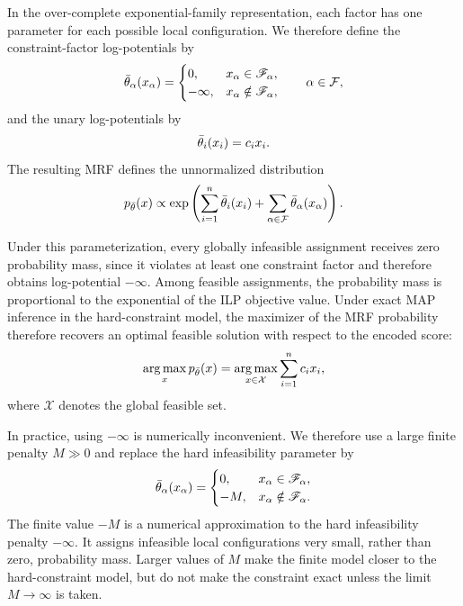 In the over-complete exponential-family representation, each factor has one parameter for each possible local configuration. We therefore define the
constraint-factor log-potentials by 
\begin{equation}
    \bar{\theta}_{\alpha}(x_{\alpha})
    =
    \begin{cases}
        0, & x_{\alpha} \in \mathscr{F}_{\alpha},\\
        -\infty, & x_{\alpha} \notin \mathscr{F}_{\alpha},
    \end{cases}
    \qquad \alpha \in \mathcal{F},
\end{equation}
and the unary log-potentials by
\begin{equation}
    \bar{\theta}_i(x_i) = c_i x_i.
\end{equation}
The resulting MRF defines the unnormalized distribution
\begin{equation}
    p_{\bar{\theta}}(x)
    \propto
    \exp \left(
        \sum_{i=1}^{n} \bar{\theta}_i(x_i)
        +
        \sum_{\alpha \in \mathcal{F}} \bar{\theta}_{\alpha}(x_{\alpha})
    \right).
\end{equation}

Under this parameterization, every globally infeasible assignment receives zero probability mass, since it violates at least one constraint factor and therefore obtains log-potential $-\infty$. Among feasible assignments, the probability mass is proportional to the exponential of the ILP objective value. Under exact MAP inference in the hard-constraint model, the maximizer of the MRF probability therefore recovers an optimal feasible solution with respect to the encoded score:
\begin{equation}
    \operatorname*{arg\,max}_{x} p_{\bar{\theta}}(x)
    =
    \operatorname*{arg\,max}_{x \in \mathcal{X}}
    \sum_{i=1}^{n} c_i x_i,
\end{equation}
where $\mathcal{X}$ denotes the global feasible set.

In practice, using $-\infty$ is numerically inconvenient. We therefore use a large finite penalty $M \gg 0$ and replace the hard infeasibility parameter by
\begin{equation}
    \bar{\theta}_{\alpha}(x_{\alpha})
    =
    \begin{cases}
        0, & x_{\alpha} \in \mathscr{F}_{\alpha},\\
        -M, & x_{\alpha} \notin \mathscr{F}_{\alpha}.
    \end{cases}
\end{equation}
The finite value $-M$ is a numerical approximation to the hard infeasibility penalty $-\infty$. It assigns infeasible local configurations very small, rather than zero, probability mass. Larger values of $M$ make the finite model closer to the hard-constraint model, but do not make the constraint exact unless the limit $M \to \infty$ is taken.

